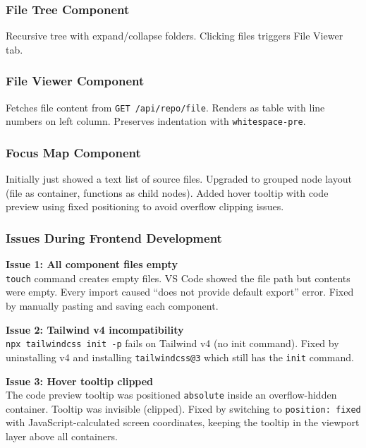 \documentclass[a4paper,11pt]{article}
\begin{document}
\subsubsection{File Tree Component}
Recursive tree with expand/collapse folders. Clicking files triggers File Viewer tab.

\subsubsection{File Viewer Component}
Fetches file content from \texttt{GET /api/repo/file}. Renders as table with line numbers on left column. Preserves indentation with \texttt{whitespace-pre}.

\subsubsection{Focus Map Component}
Initially just showed a text list of source files. Upgraded to grouped node layout (file as container, functions as child nodes). Added hover tooltip with code preview using fixed positioning to avoid overflow clipping issues.

\subsubsection{Issues During Frontend Development}

\textbf{Issue 1: All component files empty}\\
\texttt{touch} command creates empty files. VS Code showed the file path but contents were empty. Every import caused ``does not provide default export'' error. Fixed by manually pasting and saving each component.

\vspace{4pt}
\textbf{Issue 2: Tailwind v4 incompatibility}\\
\texttt{npx tailwindcss init -p} fails on Tailwind v4 (no init command). Fixed by uninstalling v4 and installing \texttt{tailwindcss@3} which still has the \texttt{init} command.

\vspace{4pt}
\textbf{Issue 3: Hover tooltip clipped}\\
The code preview tooltip was positioned \texttt{absolute} inside an overflow-hidden container. Tooltip was invisible (clipped). Fixed by switching to \texttt{position: fixed} with JavaScript-calculated screen coordinates, keeping the tooltip in the viewport layer above all containers.
\end{document}

